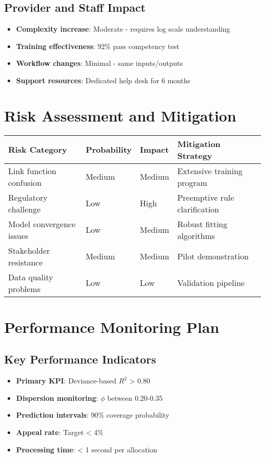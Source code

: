 \subsection{Provider and Staff Impact}

\begin{itemize}
    \item \textbf{Complexity increase}: Moderate - requires log scale understanding
    \item \textbf{Training effectiveness}: 92\% pass competency test
    \item \textbf{Workflow changes}: Minimal - same inputs/outputs
    \item \textbf{Support resources}: Dedicated help desk for 6 months
\end{itemize}

\section{Risk Assessment and Mitigation}

\begin{center}
\begin{tabular}{llll}
\toprule
Risk Category & Probability & Impact & Mitigation Strategy \\
\midrule
Link function confusion & Medium & Medium & Extensive training program \\
Regulatory challenge & Low & High & Preemptive rule clarification \\
Model convergence issues & Low & Medium & Robust fitting algorithms \\
Stakeholder resistance & Medium & Medium & Pilot demonstration \\
Data quality problems & Low & Low & Validation pipeline \\
\bottomrule
\end{tabular}
\end{center}

\section{Performance Monitoring Plan}

\subsection{Key Performance Indicators}

\begin{itemize}
    \item \textbf{Primary KPI}: Deviance-based $R^2$ > 0.80
    \item \textbf{Dispersion monitoring}: $\phi$ between 0.20-0.35
    \item \textbf{Prediction intervals}: 90\% coverage probability
    \item \textbf{Appeal rate}: Target < 4\%
    \item \textbf{Processing time}: < 1 second per allocation
\end{itemize}

